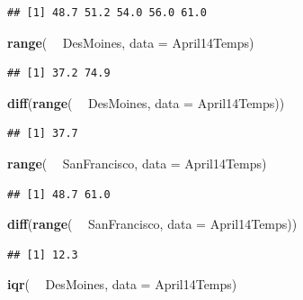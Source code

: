 \documentclass[]{book}
\newenvironment{Shaded}{\begin{snugshade}}{\end{snugshade}}
\newcommand{\DataTypeTok}[1]{\textcolor[rgb]{0.13,0.29,0.53}{#1}}
\newcommand{\KeywordTok}[1]{\textcolor[rgb]{0.13,0.29,0.53}{\textbf{#1}}}
\newcommand{\NormalTok}[1]{#1}
\newcommand{\OperatorTok}[1]{\textcolor[rgb]{0.81,0.36,0.00}{\textbf{#1}}}
\newcommand{\StringTok}[1]{\textcolor[rgb]{0.31,0.60,0.02}{#1}}
\begin{document}
\begin{verbatim}
## [1] 48.7 51.2 54.0 56.0 61.0
\end{verbatim}

\begin{Shaded}
\begin{Highlighting}[]
\KeywordTok{range}\NormalTok{( }\OperatorTok{~}\StringTok{ }\NormalTok{DesMoines, }\DataTypeTok{data =}\NormalTok{ April14Temps)}
\end{Highlighting}
\end{Shaded}

\begin{verbatim}
## [1] 37.2 74.9
\end{verbatim}

\begin{Shaded}
\begin{Highlighting}[]
\KeywordTok{diff}\NormalTok{(}\KeywordTok{range}\NormalTok{( }\OperatorTok{~}\StringTok{ }\NormalTok{DesMoines, }\DataTypeTok{data =}\NormalTok{ April14Temps))}
\end{Highlighting}
\end{Shaded}

\begin{verbatim}
## [1] 37.7
\end{verbatim}

\begin{Shaded}
\begin{Highlighting}[]
\KeywordTok{range}\NormalTok{( }\OperatorTok{~}\StringTok{ }\NormalTok{SanFrancisco, }\DataTypeTok{data =}\NormalTok{ April14Temps)}
\end{Highlighting}
\end{Shaded}

\begin{verbatim}
## [1] 48.7 61.0
\end{verbatim}

\begin{Shaded}
\begin{Highlighting}[]
\KeywordTok{diff}\NormalTok{(}\KeywordTok{range}\NormalTok{( }\OperatorTok{~}\StringTok{ }\NormalTok{SanFrancisco, }\DataTypeTok{data =}\NormalTok{ April14Temps))}
\end{Highlighting}
\end{Shaded}

\begin{verbatim}
## [1] 12.3
\end{verbatim}

\begin{Shaded}
\begin{Highlighting}[]
\KeywordTok{iqr}\NormalTok{( }\OperatorTok{~}\StringTok{ }\NormalTok{DesMoines, }\DataTypeTok{data =}\NormalTok{ April14Temps)}
\end{Highlighting}
\end{Shaded}
\end{document}
